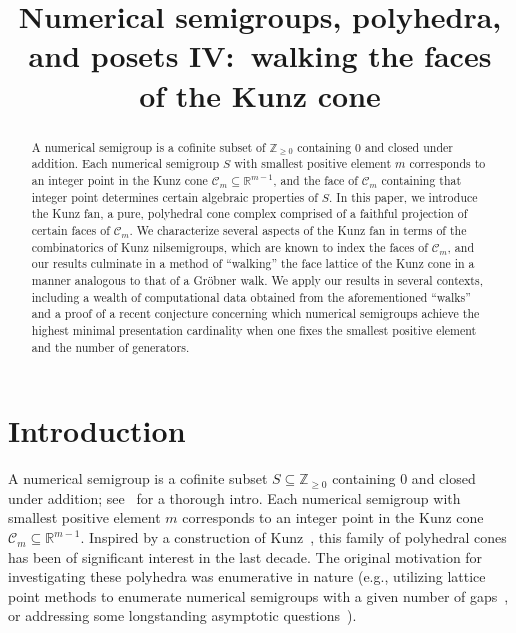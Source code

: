 \documentclass[ALCO, Unicode]{cedram}
\title
[Numerical semigroups, polyhedra, and posets IV]
{Numerical semigroups, polyhedra, \\ and posets IV:\ walking the faces \\ of the Kunz cone}
\author[\initial{C.} Brower]{\firstname{Cole} \lastname{Brower}}
\author[\initial{J.} McDonough]{\firstname{Joseph} \lastname{McDonough}}
\author[\initial{C.} O'Neill]{\firstname{Christopher} \lastname{O'Neill}}
\newcommand\ZZ{\mathbb{Z}}
\newcommand\RR{\mathbb{R}}
\newcommand\cC{{\mathcal C}}
\begin{document}
\begin{abstract}
A numerical semigroup is a cofinite subset of $\mathbb Z_{\ge 0}$ containing $0$ and closed under addition.  Each numerical semigroup $S$ with smallest positive element $m$ corresponds to an integer point in the Kunz cone $\mathcal C_m \subseteq \mathbb R^{m-1}$, and the face of $\mathcal C_m$ containing that integer point determines certain algebraic properties of $S$.  In this paper, we introduce the Kunz fan, a pure, polyhedral cone complex comprised of a faithful projection of certain faces of $\mathcal C_m$.  We characterize several aspects of the Kunz fan in terms of the combinatorics of Kunz nilsemigroups, which are known to index the faces of $\mathcal C_m$, and our results culminate in a method of ``walking'' the face lattice of the Kunz cone in a manner analogous to that of a Gr\"obner walk.  We apply our results in several contexts, including a wealth of computational data obtained from the aforementioned ``walks'' and a proof of a recent conjecture concerning which numerical semigroups achieve the highest minimal presentation cardinality when one fixes the smallest positive element and the number of generators.  
\end{abstract}


\maketitle


\section{Introduction}
\label{sec:intro}

A numerical semigroup is a cofinite subset $S \subseteq \ZZ_{\ge 0}$ containing $0$ and closed under addition; see~\cite{numericalappl} for a thorough intro.  
Each numerical semigroup with smallest positive element $m$ corresponds to an integer point in the Kunz cone $\cC_m \subseteq \RR^{m-1}$.  Inspired by a construction of Kunz~\cite{kunz}, this family of polyhedral cones has been of significant interest in the last decade.  The original motivation for investigating these polyhedra was enumerative in nature (e.g., utilizing lattice point methods to enumerate numerical semigroups with a given number of gaps~\cite{kunzcoords}, or addressing some longstanding asymptotic questions~\cite{kaplancounting}).  
\end{document}

